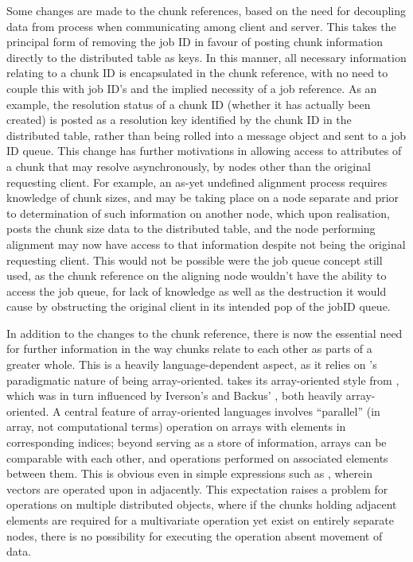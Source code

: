 Some changes are made to the chunk references, based on the need for decoupling data
from process when communicating among client and server.
This takes the principal form of removing the job ID in favour of posting chunk
information directly to the distributed table as keys.
In this manner, all necessary information relating to a chunk ID is
encapsulated in the chunk reference, with no need to couple this with job ID's
and the implied necessity of a job reference.
As an example, the resolution status of a chunk ID (whether it has actually
been created) is posted as a resolution key identified by the chunk ID in the
distributed table, rather than being rolled into a message object and sent to a
job ID queue.
This change has further motivations in allowing access to attributes of a chunk
that may resolve asynchronously, by nodes other than the original requesting
client.
For example, an as-yet undefined alignment process requires knowledge of chunk
sizes, and may be taking place on a node separate and prior to determination of
such information on another node, which upon realisation, posts the chunk size
data to the distributed table, and the node performing alignment may now have
access to that information despite not being the original requesting client.
This would not be possible were the job queue concept still used, as the chunk
reference on the aligning node wouldn't have the ability to access the job
queue, for lack of knowledge as well as the destruction it would cause by
obstructing the original client in its intended pop of the jobID queue.

In addition to the changes to the chunk reference, there is now the essential
need for further information in the way chunks relate to each other as parts of
a greater whole.
This is a heavily language-dependent aspect, as it relies on \R{}'s paradigmatic
nature of being array-oriented.
\R{} takes its array-oriented style from , which was in turn influenced by
Iverson's  and Backus' , both heavily
array-oriented\cites{becker1994shistory,iverson2007notation}.
A central feature of array-oriented languages involves ``parallel'' (in array,
not computational terms) operation on arrays with elements in corresponding
indices; beyond serving as a store of information, arrays can be comparable
with each other, and operations performed on associated elements between them.
This is obvious even in simple expressions such as 
, wherein vectors are operated upon in
adjacently.
This expectation raises a problem for operations on multiple distributed
objects, where if the chunks holding adjacent elements are required for a
multivariate operation yet exist on entirely separate nodes, there is no
possibility for executing the operation absent movement of data.

